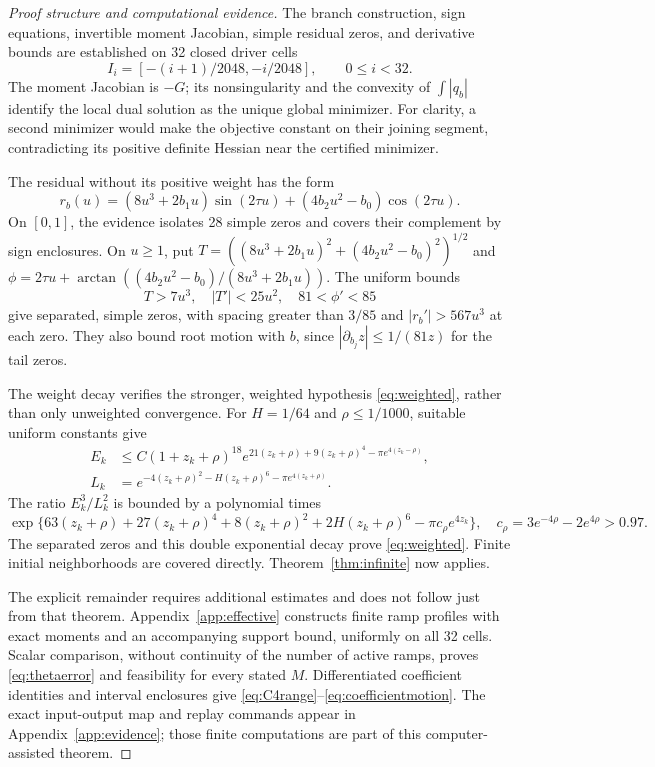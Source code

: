 \begin{proof}[Proof structure and computational evidence]
The branch construction, sign equations, invertible moment Jacobian,
simple residual zeros, and derivative bounds are established on
32 closed driver cells
\[
 I_i=[-(i+1)/2048,-i/2048],\qquad 0\leq i<32.
\]
The moment Jacobian is \(-G\); its nonsingularity and the convexity of
\(\int|q_b|\) identify the local dual solution as the unique global
minimizer. For clarity, a second minimizer would make the objective
constant on their joining segment, contradicting its positive
definite Hessian near the certified minimizer.

The residual without its positive weight has the form
\begin{equation}\label{eq:rawresidual}
 r_b(u)=(8u^3+2b_1u)\sin(2\tau u)
                  +(4b_2u^2-b_0)\cos(2\tau u).
\end{equation}
On \([0,1]\), the evidence isolates 28 simple zeros and covers their
complement by sign enclosures. On \(u\geq1\), put
\(T=( (8u^3+2b_1u)^2+(4b_2u^2-b_0)^2)^{1/2}\) and
\(\phi=2\tau u+\arctan((4b_2u^2-b_0)/(8u^3+2b_1u))\).
The uniform bounds
\[
 T>7u^3,\quad |T'|<25u^2,\quad 81<\phi'<85
\]
give separated, simple zeros, with spacing greater than \(3/85\) and
\(|r_b'|>567u^3\) at each zero.
They also bound root motion with \(b\), since
\(|\partial_{b_j}z|\leq1/(81z)\) for the tail zeros.

The weight decay verifies the stronger, weighted hypothesis
\eqref{eq:weighted}, rather than only unweighted convergence.
For \(H=1/64\) and \(\rho\leq1/1000\), suitable uniform constants give
\begin{align*}
 E_k&\leq C(1+z_k+\rho)^{18}
 e^{21(z_k+\rho)+9(z_k+\rho)^4-\pi e^{4(z_k-\rho)}},\\
 L_k&=e^{-4(z_k+\rho)^2-H(z_k+\rho)^6-\pi e^{4(z_k+\rho)}}.
\end{align*}
The ratio \(E_k^3/L_k^2\) is bounded by a polynomial times
\[
 \exp\{63(z_k+\rho)+27(z_k+\rho)^4+8(z_k+\rho)^2
       +2H(z_k+\rho)^6-\pi c_\rho e^{4z_k}\},
 \quad c_\rho=3e^{-4\rho}-2e^{4\rho}>0.97 .
\]
The separated zeros and this double exponential decay prove
\eqref{eq:weighted}. Finite initial neighborhoods are covered directly.
Theorem~\ref{thm:infinite} now applies.

The explicit remainder requires additional estimates and does not
follow just from that theorem. Appendix~\ref{app:effective} constructs
finite ramp profiles with exact moments and an accompanying support
bound, uniformly on all 32 cells. Scalar comparison, without continuity
of the number of active ramps, proves \eqref{eq:thetaerror} and
feasibility for every stated \(M\).
Differentiated coefficient identities and interval enclosures give
\eqref{eq:C4range}--\eqref{eq:coefficientmotion}.
The exact input-output map and replay commands appear in
Appendix~\ref{app:evidence}; those finite computations are part of this
computer-assisted theorem.
\end{proof}

